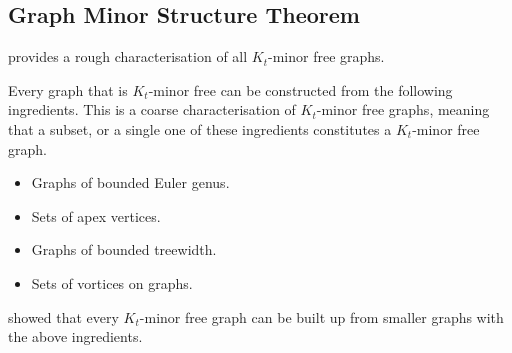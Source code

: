 \subsection{Graph Minor Structure Theorem}
\textcite{robertsonGraphMinorsXVII1999} provides a rough characterisation of all \(K_t\)-minor free graphs. 

Every graph that is $K_t$-minor free can be constructed from the following ingredients. This is a coarse characterisation of $K_t$-minor free graphs, meaning that a subset, or a single one of these ingredients constitutes a $K_t$-minor free graph. 
\begin{itemize}
	\item Graphs of bounded Euler genus.
	\item Sets of apex vertices.
	\item Graphs of bounded treewidth.
	\item Sets of vortices on graphs.
\end{itemize}
\textcite{robertsonGraphMinorsXVII1999} showed that every \(K_t\)-minor free graph can be built up from smaller graphs with the above ingredients.